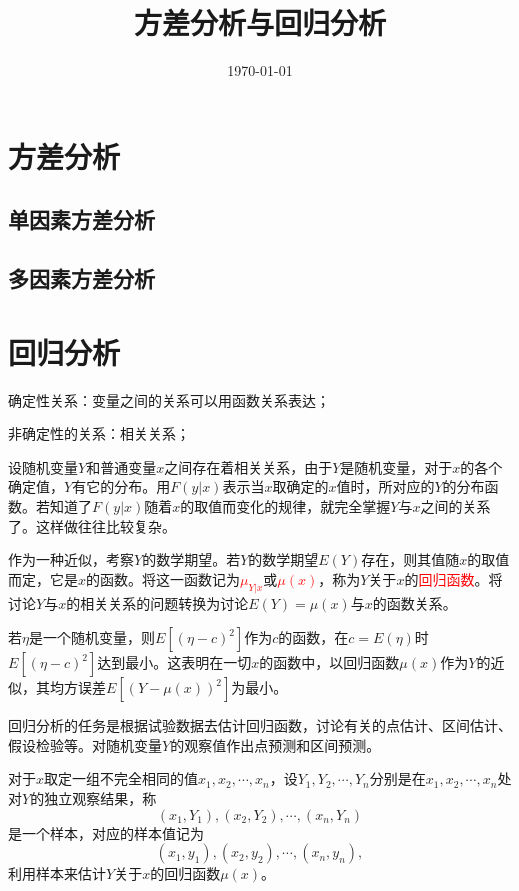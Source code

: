 \documentclass[12pt,a4paper]{article}
\title{方差分析与回归分析}
\author{}
\date{\today}
\begin{document}
\maketitle

\section{方差分析}

\subsection{单因素方差分析}

\subsection{多因素方差分析}

\section{回归分析}
确定性关系：变量之间的关系可以用函数关系表达；

非确定性的关系：相关关系；

设随机变量$Y$和普通变量$x$之间存在着相关关系，由于$Y$是随机变量，对于$x$的各个确定值，$Y$有它的分布。用$F(y|x)$表示当$x$取确定的$x$值时，所对应的$Y$的分布函数。若知道了$F(y|x)$随着$x$的取值而变化的规律，就完全掌握$Y$与$x$之间的关系了。这样做往往比较复杂。

作为一种近似，考察$Y$的数学期望。若$Y$的数学期望$E(Y)$存在，则其值随$x$的取值而定，它是$x$的函数。将这一函数记为\textcolor{red}{$\mu_{Y|x}$}或\textcolor{red}{$\mu(x)$}，称为$Y$关于$x$的\textcolor{red}{回归函数}。将讨论$Y$与$x$的相关关系的问题转换为讨论$E(Y) = \mu(x)$与$x$的函数关系。

若$\eta$是一个随机变量，则$E[(\eta -c)^2]$作为$c$的函数，在$c=E(\eta)$时$E[(\eta -c)^2]$达到最小。这表明在一切$x$的函数中，以回归函数$\mu(x)$作为$Y$的近似，其均方误差$E[(Y -\mu(x))^2]$为最小。

回归分析的任务是根据试验数据去估计回归函数，讨论有关的点估计、区间估计、假设检验等。对随机变量$Y$的观察值作出点预测和区间预测。

对于$x$取定一组不完全相同的值$x_1, x_2, \cdots, x_n$，设$Y_1, Y_2, \cdots, Y_n$分别是在$x_1, x_2, \cdots, x_n$处对$Y$的独立观察结果，称
\begin{equation}
(x_1, Y_1), (x_2, Y_2), \cdots, (x_n, Y_n) 
\end{equation}
是一个样本，对应的样本值记为
\begin{equation}
(x_1, y_1), (x_2, y_2), \cdots, (x_n, y_n) ,
\end{equation}
利用样本来估计$Y$关于$x$的回归函数$\mu(x)$。
\end{document}
